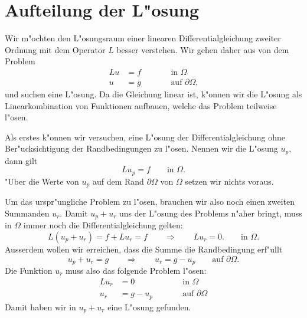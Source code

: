 \section{Aufteilung der L"osung}
Wir m"ochten den L"osungsraum einer linearen Differentialgleichung
zweiter Ordnung mit dem Operator $L$ besser verstehen.
Wir gehen daher aus von dem Problem
\begin{equation}
\begin{aligned}
Lu&=f&&\qquad\text{in $\Omega$}\\
 u&=g&&\qquad\text{auf $\partial\Omega$,}
\end{aligned}
\label{pdgl2ord:allg}
\end{equation}
und suchen eine L"osung.
Da die Gleichung linear ist, k"onnen wir die L"osung als Linearkombination
von Funktionen aufbauen, welche das Problem teilweise l"osen.

Als erstes k"onnen wir versuchen, eine L"osung der Differentialgleichung
ohne Ber"ucksichtigung der Randbedingungen zu l"osen.
Nennen wir die L"osung $u_p$, dann gilt
\begin{equation}
Lu_p=f\qquad\text{in $\Omega$.}
\label{pdgl2ord:up}
\end{equation}
"Uber die Werte von $u_p$ auf dem Rand $\partial\Omega$ von $\Omega$
setzen wir nichts voraus.

Um das urspr"ungliche Problem zu l"osen, brauchen wir also noch einen
zweiten Summanden $u_r$. 
Damit $u_p+u_r$ uns der L"osung des Problems n"aher bringt, muss in
$\Omega$ immer noch die Differentialgleichung gelten:
\[
L(u_p+u_r)=f+Lu_r=f\qquad\Rightarrow\qquad Lu_r=0.
\qquad\text{in $\Omega$.}
\]
Ausserdem wollen wir erreichen, dass die Summe die Randbedingung erf"ullt
\[
u_p+u_r=g\qquad\Rightarrow\qquad u_r=g-u_p\qquad\text{auf $\partial\Omega$.}
\]
Die Funktion $u_r$ muss also das folgende Problem l"osen:
\begin{equation}
\begin{aligned}
Lu_r&=0&&\qquad\text{in $\Omega$}\\
 u_r&=g-u_p&&\qquad\text{auf $\partial\Omega$}
\end{aligned}
\label{pdgl2ord:ur}
\end{equation}
Damit haben wir in $u_p+u_r$ eine L"osung gefunden.

